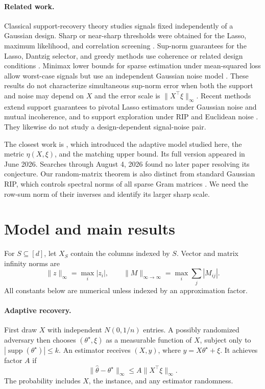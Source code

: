 \documentclass[twoside]{article}
\newcommand{\supp}{\operatorname{supp}}
\begin{document}
\paragraph{Related work.}
Classical support-recovery theory studies signals fixed independently of a Gaussian design. Sharp or near-sharp thresholds were obtained for the Lasso, maximum likelihood, and correlation screening \citep{wainwright2009threshold,fletcher2009support,wainwright2009information}. Sup-norm guarantees for the Lasso, Dantzig selector, and greedy methods use coherence or related design conditions \citep{lounici2008supnorm,ye2010minimax,cai2011omp}. Minimax lower bounds for sparse estimation under mean-squared loss allow worst-case signals but use an independent Gaussian noise model \citep{candes2013estimate}. These results do not characterize simultaneous sup-norm error when both the support and noise may depend on $X$ and the error scale is $\|X^\top\xi\|_\infty$. Recent methods extend support guarantees to pivotal Lasso estimators under Gaussian noise and mutual incoherence, and to support exploration under RIP and Euclidean noise \citep{massias2020pivotal,mohamed2024sea}. They likewise do not study a design-dependent signal-noise pair.

The closest work is \citet{chen2026adaptive}, which introduced the adaptive model studied here, the metric $\eta(X,\xi)$, and the matching upper bound. Its full version appeared in June 2026. Searches through August 4, 2026 found no later paper resolving its conjecture. Our random-matrix theorem is also distinct from standard Gaussian RIP, which controls spectral norms of all sparse Gram matrices \citep{foucart2013compressive,vershynin2018highdimensional}. We need the row-sum norm of their inverses and identify its larger sharp scale.

\section{Model and main results}
\label{sec:results}

For $S\subseteq[d]$, let $X_S$ contain the columns indexed by $S$. Vector and matrix infinity norms are \[ \|z\|_\infty=\max_i|z_i|, \qquad \|M\|_{\infty\to\infty}=\max_i\sum_j|M_{ij}|. \] All constants below are numerical unless indexed by an approximation factor.

\paragraph{Adaptive recovery.}
First draw $X$ with independent $N(0,1/n)$ entries. A possibly randomized adversary then chooses $(\theta^\star,\xi)$ as a measurable function of $X$, subject only to $|\supp(\theta^\star)|\leq k$. An estimator receives $(X,y)$, where $y=X\theta^\star+\xi$. It achieves factor $A$ if \[ \|\widehat\theta-\theta^\star\|_\infty \leq A\|X^\top\xi\|_\infty. \tag{1} \] The probability includes $X$, the instance, and any estimator randomness.
\end{document}
